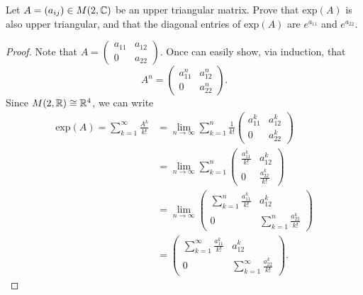 \documentclass{article}
\begin{document}
\begin{problem}
    Let \( A = ({a}_{ij}) \in M(2,\mathbb{C}) \) be an upper triangular matrix. Prove that \( \text{exp}(A)  \) is also upper triangular, and that the diagonal entries of \( \text{exp}(A)   \) are \( e^{{a}_{11}}  \) and \( e^{{a}_{22}} \).
\end{problem}
\begin{proof}
    Note that \( A = \displaystyle \begin{pmatrix} {a}_{11} & {a}_{12} \\ 0 & {a}_{22} \end{pmatrix}  \). Once can easily show, via induction, that 
    \[ A^{n} = \begin{pmatrix} {a}_{11}^{n} & {a}_{12}^{n} \\ 0 & {a}_{22}^{n} \end{pmatrix}. \]
    Since \( M(2,\mathbb{R}) \cong \mathbb{R}^{4} \), we can write
    \begin{align*}
        \text{exp}(A) = \sum_{ k=1  }^{ \infty  } \frac{ A^{k} }{ k! } &= \lim_{ n \to \infty  }  \sum_{ k=1  }^{ n } \frac{ 1 }{ k! }  \begin{pmatrix} {a}_{11}^{k} & {a}_{12}^{k} \\ 0 & {a}_{22}^{k} \end{pmatrix}  \\
                                                                       &= \lim_{ n \to \infty  }  \sum_{ k=1  }^{ n } \begin{pmatrix} \frac{ {a}_{11}^{k} }{ k! }  & {a}_{12}^{k} \\ 0 & \frac{ {a}_{22}^{k} }{ k! }  \end{pmatrix}  \\
                                                                       &= \lim_{ n \to \infty  }   \begin{pmatrix} \sum_{ k=1  }^{ n } \frac{ {a}_{11}^{k} }{ k! }  & {a}_{12}^{k} \\ 0 & \sum_{ k=1  }^{ n } \frac{ {a}_{22}^{k} }{ k! }  \end{pmatrix}   \\
                                                                       &= \begin{pmatrix} \sum_{ k=1  }^{ \infty  } \frac{ {a}_{11}^{k} }{ k!  }  & {a}_{12}^{k} \\ 0 & \sum_{ k=1  }^{ \infty  } \frac{ {a}_{22}^{k} }{ k! }  \end{pmatrix}.
    \end{align*}
\end{proof}
\end{document}
